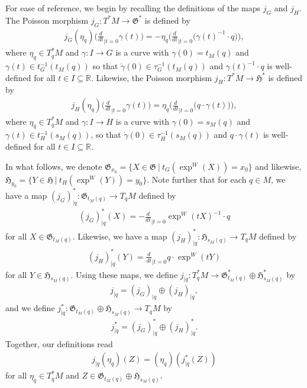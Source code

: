 \documentclass[sn-mathphys,Numbered]{sn-jnl}
\begin{document}
For ease of reference, we begin by recalling the definitions of the maps $j_G$ and $j_H$.  The Poisson morphism $j_G: T^*M\to \mathfrak{G}^*$ is defined by
\begin{align}
    j_G(\eta_q)\Big(\frac{d}{dt}_{|t=0} \gamma(t)\Big) = -\eta_q\Big(\frac{d}{dt}_{|t=0}\big(\gamma(t)^{-1}\cdot q\big)\Big),
\end{align}
where $\eta_q\in T^*_qM$ and $\gamma:I\to G$ is a curve with $\gamma(0) = t_M(q)$ and $\gamma(t)\in t_G^{-1}(t_M(q))$ so that $\dot{\gamma}(0)\in \tau_G^{-1}(t_M(q))$ and $\gamma(t)^{-1}\cdot q$ is well-defined for all $t\in I\subseteq \mathbb{R}$.  Likewise, the Poisson morphism $j_H: T^*M\to \mathfrak{H}^*$ is defined by
\begin{align}
    j_H(\eta_q)\Big(\frac{d}{dt}_{|t=0} \gamma(t)\Big) = \eta_q\Big(\frac{d}{dt}_{|t=0} \big(q\cdot \gamma(t)\big)\Big),
\end{align}
where $\eta_q\in T^*_qM$ and $\gamma: I\to H$ is a curve with $\gamma(0) = s_M(q)$ and $\gamma(t)\in t_H^{-1}(s_M(q))$, so that $\dot{\gamma}(0)\in \tau_H^{-1}(s_M(q))$ and $q\cdot \gamma(t)$ is well-defined for all $t\in I\subseteq \mathbb{R}$.

In what follows, we denote $\mathfrak{G}_{x_0} = \{X\in\mathfrak{G}\ |\ t_G(\exp^W(X)) = x_0\}$ and likewise, $\mathfrak{H}_{y_0} = \{Y\in\mathfrak{H}\ |\ t_H(\exp^W(Y)) = y_0\}$.  Note further that for each $q\in M$, we have a map $(j_G)^*_{|q}: \mathfrak{G}_{t_M(q)}\to T_qM$ defined by
\begin{align}
    (j_G)^*_{|q}(X) = -\frac{d}{dt}_{|t=0}\exp^W(tX)^{-1}\cdot q
\end{align}
for all $X\in \mathfrak{G}_{t_M(q)}$.  Likewise, we have a map $(j_H)^*_{|q}: \mathfrak{H}_{s_M(q)}\to T_q M$ defined by
\begin{align}
    (j_H)^*_{|q}(Y) = \frac{d}{dt}_{|t=0} q\cdot \exp^W(tY)
\end{align}
for all $Y\in \mathfrak{H}_{s_M(q)}$. 
 Using these maps, we define $j_{|q}: T^*_qM\to \mathfrak{G}^*_{t_M(q)}\oplus\mathfrak{H}^*_{s_M(q)}$ by
\begin{align}
    j_{|q} = (j_G)_{|q}\oplus (j_H)_{|q},
\end{align}
and we define $j^*_{|q}: \mathfrak{G}_{t_M(q)}\oplus\mathfrak{H}_{s_M(q)}\to T_qM$ by
\begin{align}
    j^*_{|q} = (j_G)^*_{|q} \oplus (j_H)^*_{|q}.
\end{align}
Together, our definitions read
\begin{align}
    j_{|q}(\eta_q)(Z) = (\eta_q)(j^*_{|q}(Z))
\end{align}
for all $\eta_q\in T^*_qM$ and $Z\in\mathfrak{G}_{t_M(q)}\oplus\mathfrak{H}_{s_M(q)}$.
\end{document}
